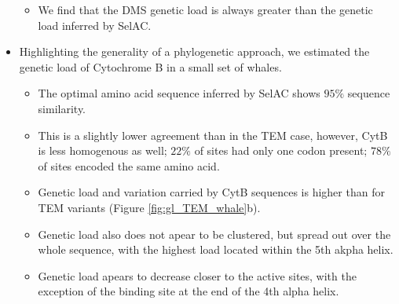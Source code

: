 \documentclass[12pt]{article}
\begin{document}
\begin{itemize}
\begin{itemize}
		\item We find that the DMS genetic load is always greater than the genetic load inferred by SelAC.
	\end{itemize}
	\item Highlighting the generality of a phylogenetic approach, we estimated the genetic load of Cytochrome B in a small set of whales.
	\begin{itemize}
		\item The optimal amino acid sequence inferred by SelAC shows $95\%$ sequence similarity.
		\item This is a slightly lower agreement than in the TEM case, however, CytB is less homogenous as well; $22 \%$ of sites had only one codon present; $78 \%$ of sites encoded the same amino acid.
		\item Genetic load and variation carried by CytB sequences is higher than for TEM variants (Figure \ref{fig:gl_TEM_whale}b).
		\item Genetic load also does not apear to be clustered, but spread out over the whole sequence, with the highest load located within the 5th akpha helix.
		\item Genetic load apears to decrease closer to the active sites, with the exception of the binding site at the end of the 4th alpha helix.
	\end{itemize}
\end{itemize}
\end{document}
